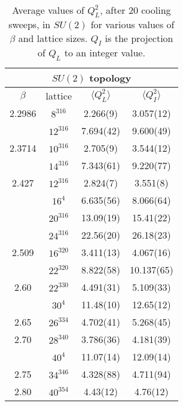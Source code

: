 \documentclass[12pt]{article}
\begin{document}
\begin{table}[htb]
\centering
\begin{tabular}{|c|c|c|c|} \hline
\multicolumn{4}{|c|}{$SU(2)$ topology} \\ \hline
$\beta$  &  lattice  & $\langle Q_L^2 \rangle$ & $\langle Q_I^2 \rangle$ \\ \hline
2.2986  & $8^316$  & 2.266(9)  & 3.057(12)    \\ 
        & $12^316$ & 7.694(42) & 9.600(49)    \\   \hline
2.3714  & $10^316$ & 2.705(9)  & 3.544(12)    \\ 
        & $14^316$ & 7.343(61) & 9.220(77)    \\   \hline
2.427   & $12^316$ & 2.824(7)  & 3.551(8)     \\ 
        & $16^4$   & 6.635(56) & 8.066(64)    \\ 
        & $20^316$ & 13.09(19) & 15.41(22)   \\  
        & $24^316$ & 22.56(20) & 26.18(23)    \\   \hline
2.509   & $16^320$ & 3.411(13) & 4.067(16)    \\ 
        & $22^320$ & 8.822(58) & 10.137(65)   \\   \hline
2.60    & $22^330$ & 4.491(31)  & 5.109(33)   \\ 
        & $30^4$   & 11.48(10)  & 12.65(12)   \\  \hline
2.65    & $26^334$ & 4.702(41)  & 5.268(45)   \\  \hline
2.70    & $28^340$ & 3.786(36)  & 4.181(39)   \\ 
        & $40^4$   & 11.07(14)  & 12.09(14)   \\ \hline
2.75    & $34^346$ & 4.328(88)  & 4.711(94)   \\   \hline
2.80    & $40^354$ & 4.43(12)   & 4.76(12)   \\   \hline
\end{tabular}
\caption{Average values of $Q^2_L$, after 20 cooling sweeps, in $SU(2)$ for various values of $\beta$ and lattice sizes.
  $Q_I$ is the projection of $Q_L$ to an integer value.}
\label{table_QQ_SU2}
\end{table}
\end{document}
